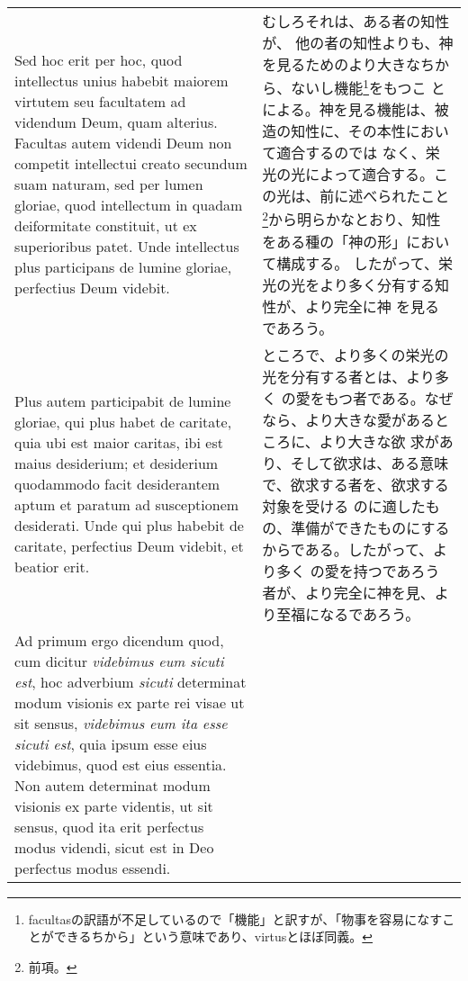 \documentclass[10pt]{jsarticle} %
\begin{document}
\begin{longtable}{p{21em}p{21em}}
\\

Sed hoc erit per
hoc, quod intellectus unius habebit maiorem virtutem seu facultatem ad
videndum Deum, quam alterius. Facultas autem videndi Deum non competit
intellectui creato secundum suam naturam, sed per lumen gloriae, quod
intellectum in quadam deiformitate constituit, ut ex superioribus
patet. Unde intellectus plus participans de lumine gloriae, perfectius
Deum videbit.

&

むしろそれは、ある者の知性が、
他の者の知性よりも、神を見るためのより大きなちから、ないし機能\footnote{facultasの訳語が不足しているので「機能」と訳すが、「物事を容易になすことができるちから」という意味であり、virtusとほぼ同義。}をもつこ
とによる。神を見る機能は、被造の知性に、その本性において適合するのでは
なく、栄光の光によって適合する。この光は、前に述べられたこと
\footnote{前項。}から明らかなとおり、知性をある種の「神の形」において構成する。
したがって、栄光の光をより多く分有する知性が、より完全に神
を見るであろう。

\\

Plus autem participabit de lumine gloriae, qui plus
habet de caritate, quia ubi est maior caritas, ibi est maius
desiderium; et desiderium quodammodo facit desiderantem aptum et
paratum ad susceptionem desiderati. Unde qui plus habebit de caritate,
perfectius Deum videbit, et beatior erit.

&

ところで、より多くの栄光の光を分有する者とは、より多く
の愛をもつ者である。なぜなら、より大きな愛があるところに、より大きな欲
求があり、そして欲求は、ある意味で、欲求する者を、欲求する対象を受ける
のに適したもの、準備ができたものにするからである。したがって、より多く
の愛を持つであろう者が、より完全に神を見、より至福になるであろう。

\\

{\sc Ad primum ergo dicendum} quod, cum dicitur {\it videbimus eum
sicuti est}, hoc adverbium {\it sicuti} determinat modum visionis ex
parte rei visae ut sit sensus, {\it videbimus eum ita esse sicuti
est}, quia ipsum esse eius videbimus, quod est eius essentia. Non
autem determinat modum visionis ex parte videntis, ut sit sensus, quod
ita erit perfectus modus videndi, sicut est in Deo perfectus modus
essendi.

&


\end{longtable}
\end{document}
